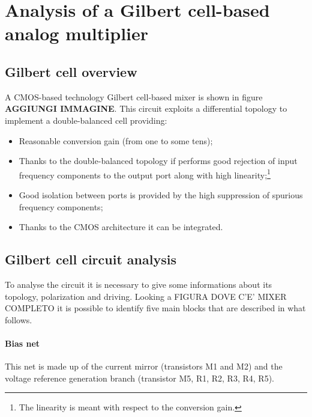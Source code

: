 \section{Analysis of a Gilbert cell-based analog multiplier }

\subsection{Gilbert cell overview}
A CMOS-based technology Gilbert cell-based mixer is shown in figure \textbf{AGGIUNGI IMMAGINE}. This circuit exploits a differential topology to implement a double-balanced cell providing:
\begin{itemize}
	\item Reasonable conversion gain (from one to some tens);
	\item Thanks to the double-balanced topology if performs good rejection of input frequency components to the output port along with high linearity;\footnote{The linearity is meant with respect to the conversion gain.}
	\item Good isolation between ports is provided by the high suppression of spurious frequency components;
	\item Thanks to the CMOS architecture it can be integrated.
\end{itemize}
\subsection{Gilbert cell circuit analysis}
To analyse the circuit it is necessary to give some informations about its topology, polarization and driving. Looking a FIGURA DOVE C'E' MIXER COMPLETO it is possible to identify five main blocks that are described in what follows.
\paragraph{Bias net}

This net is made up of the current mirror (transistors M1 and M2) and the voltage reference generation branch (transistor M5, R1, R2, R3, R4, R5). 

